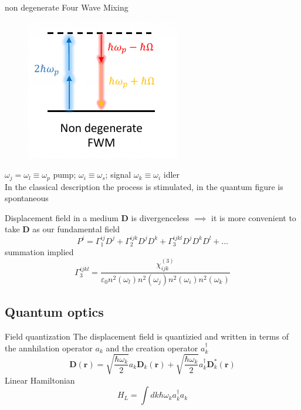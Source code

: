 \documentclass{beamer}
\renewcommand{\r}{\mathbf{r}}
\begin{document}
\begin{frame}[plain]{non degenerate Four Wave Mixing}
\begin{figure}
\centering
\includegraphics[width = .4\textwidth]{NondegFWM}
\end{figure}
$\omega_j = \omega_l \equiv \omega_p$ pump; $\omega_i\equiv \omega_s$;  signal $\omega_k \equiv \omega_i$ idler\\
In the classical description the process is stimulated, in the quantum figure is spontaneous
\end{frame}


\begin{frame}[plain]{Displacement field}
in a medium $\mathbf{D}$ is divergenceless $\implies$ it is more convenient to take $\mathbf{D}$ as our fundamental field
\begin{equation}P^i = \Gamma^{ij}_1D^j +\Gamma_2^{ijk}D^jD^k + \Gamma_3^{ijkl}D^jD^kD^l + \dots\end{equation}
summation implied
\begin{equation}\Gamma_3^{ijkl} = \frac{\chi_{ijk}^{(3)}}{\varepsilon_0 n^2(\omega_l)n^2(\omega_j)n^2(\omega_i)n^2(\omega_k)}\end{equation}
\end{frame}

\subsection{Quantum optics}
\begin{frame}[plain]{Field quantization}
The displacement field is quantizied and written in terms of the annhilation operator $a_k$ and the creation operator $a_k^\dagger$
\begin{equation}
\mathbf{D}(\r) = \sqrt{\frac{\hbar \omega_k}{2}}a_k \mathbf{D}_k(\r) + \sqrt{\frac{\hbar \omega_k}{2}}a_k^\dagger \mathbf{D}^*_k(\r)
\end{equation}
Linear Hamiltonian 
\begin{equation}H_L = \int dk \hbar \omega_k a_k^\dagger a_k  \end{equation}
\end{frame}
\end{document}
